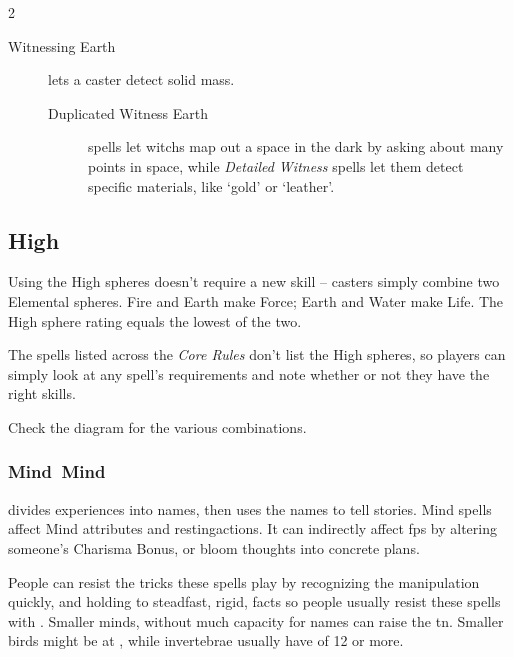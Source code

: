 \begin{multicols}{2}
\begin{description}
  \item[Witnessing Earth]
  lets a caster detect solid mass.
  \begin{description}
    \item[Duplicated Witness Earth]
    \glspl{spell} let \glspl{witch} map out a space in the dark by asking about many points in space, while \textit{Detailed Witness} \glspl{spell} let them detect specific materials, like `gold' or `leather'.
  \end{description}
\end{description}

\begin{figure}[t!]
  \centering
  \speltogram
  \label{speltogram}
\end{figure}

\subsection{High }

Using the High \glspl{sphere} doesn't require a new \gls{skill} -- casters simply combine two Elemental \glspl{sphere}.
Fire and Earth make Force; Earth and Water make Life.
The High \gls{sphere} rating equals the lowest of the two.

The spells listed across the \textit{Core Rules} don't list the High \glspl{sphere}, so players can simply look at any spell's requirements and note whether or not they have the right \glspl{skill}.

Check the diagram  for the various combinations.

\subsubsection[Mind]{\gls{Mind}~Mind}
divides experiences into names, then uses the names to tell stories.
Mind \glspl{spell} affect Mind \glspl{attribute} and \glspl{restingaction}.
It can indirectly affect \glspl{fp} by altering someone's Charisma Bonus, or bloom thoughts into concrete plans.

People can resist the tricks these \glspl{spell} play by recognizing the manipulation quickly, and holding to steadfast, rigid, facts so people usually resist these \glspl{spell} with .
Smaller minds, without much capacity for names can raise the \gls{tn}.
Smaller birds might be at \tn[9], while invertebrae usually have  of 12 or more.


\end{multicols}
